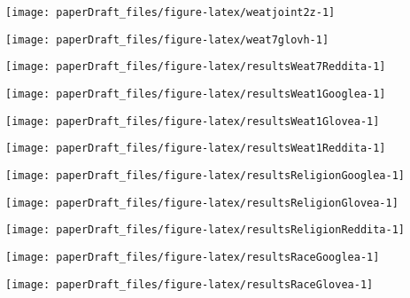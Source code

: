 \documentclass[
  12pt,
  dvipsnames,enabledeprecatedfontcommands]{scrartcl}
\begin{document}
\label{appendix:visualizations}

\begin{center}\texttt{[image: paperDraft\_files/figure-latex/weatjoint2z-1]} \end{center}

\pagebreak

\begin{center}\texttt{[image: paperDraft\_files/figure-latex/weat7glovh-1]} \end{center}

\begin{center}\texttt{[image: paperDraft\_files/figure-latex/resultsWeat7Reddita-1]} \end{center}

\begin{center}\texttt{[image: paperDraft\_files/figure-latex/resultsWeat1Googlea-1]} \end{center}

\begin{center}\texttt{[image: paperDraft\_files/figure-latex/resultsWeat1Glovea-1]} \end{center}

\begin{center}\texttt{[image: paperDraft\_files/figure-latex/resultsWeat1Reddita-1]} \end{center}

\begin{center}\texttt{[image: paperDraft\_files/figure-latex/resultsReligionGooglea-1]} \end{center}

\begin{center}\texttt{[image: paperDraft\_files/figure-latex/resultsReligionGlovea-1]} \end{center}

\begin{center}\texttt{[image: paperDraft\_files/figure-latex/resultsReligionReddita-1]} \end{center}

\begin{center}\texttt{[image: paperDraft\_files/figure-latex/resultsRaceGooglea-1]} \end{center}

\begin{center}\texttt{[image: paperDraft\_files/figure-latex/resultsRaceGlovea-1]} \end{center}
\end{document}
